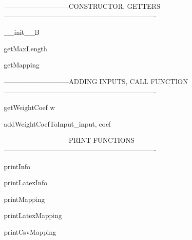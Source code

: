 -----------------------------CONSTRUCTOR, GETTERS-------------------------------------------------------------------

\begin{method}{\_\_init\_\_}{B}

\end{method}

\begin{method}{getMaxLength}{}

\end{method}


\begin{method}{getMapping}{}

\end{method}


-----------------------------ADDING INPUTS, CALL FUNCTION-------------------------------------------------------------------

\begin{method}{getWeightCoef}{ w}

\end{method}


\begin{method}{addWeightCoefToInput}{\_input, coef}

\end{method}


-----------------------------PRINT FUNCTIONS-------------------------------------------------------------------

\begin{method}{printInfo}{}

\end{method}


\begin{method}{printLatexInfo}{}

\end{method}


\begin{method}{printMapping}{}

\end{method}


\begin{method}{printLatexMapping}{}

\end{method}


\begin{method}{printCsvMapping}{}

\end{method}